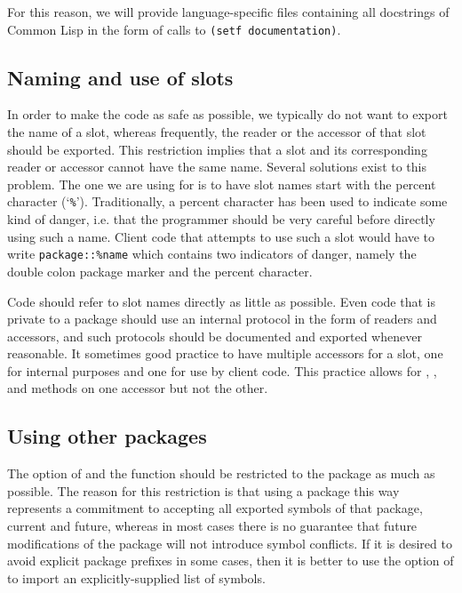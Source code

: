 For this reason, we will provide language-specific files containing
all docstrings of Common Lisp in the form of calls to \texttt{(setf
documentation)}. 

\subsection{Naming and use of slots}

In order to make the code as safe as possible, we typically do not
want to export the name of a slot, whereas frequently, the reader or
the accessor of that slot should be exported.  This restriction
implies that a slot and its corresponding reader or accessor cannot
have the same name.  Several solutions exist to this problem.  The one
we are using for \sysname{} is to have slot names start with the
percent character (`\texttt{\%}').  Traditionally, a percent character
has been used to indicate some kind of danger, i.e. that the
programmer should be very careful before directly using such a name.
Client code that attempts to use such a slot would have to write
\texttt{package::\%name} which contains two indicators of danger,
namely the double colon package marker and the percent character.

Code should refer to slot names directly as little as possible.  Even
code that is private to a package should use an internal protocol in
the form of readers and accessors, and such protocols should be
documented and exported whenever reasonable.  It sometimes good
practice to have multiple accessors for a slot, one for internal
purposes and one for use by client code.  This practice allows for
, , and  methods on one
accessor but not the other. 

\subsection{Using other packages}

The  option of  and the 
function should be restricted to the  package as
much as possible.  The reason for this restriction is that using a
package this way represents a commitment to accepting all exported
symbols of that package, current and future, whereas in most cases
there is no guarantee that future modifications of the package will
not introduce symbol conflicts.  If it is desired to avoid explicit
package prefixes in some cases, then it is better to use the
 option of  to import an
explicitly-supplied list of symbols.

